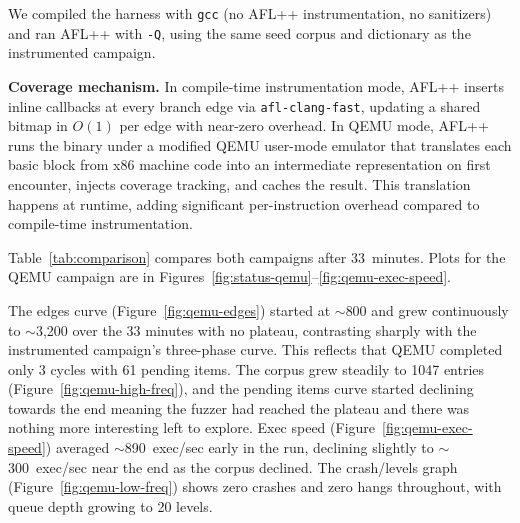 \documentclass[letterpaper,twocolumn,10pt]{article}
\begin{document}
We compiled the harness with \texttt{gcc} (no AFL++ instrumentation,
no sanitizers) and ran AFL++ with \texttt{-Q}, using the same seed
corpus and dictionary as the instrumented campaign.
 
\textbf{Coverage mechanism.} In compile-time instrumentation mode,
AFL++ inserts inline callbacks at every branch edge via
\texttt{afl-clang-fast}, updating a shared bitmap in $O(1)$ per
edge with near-zero overhead. In QEMU mode, AFL++ runs the binary
under a modified QEMU user-mode emulator that translates each basic
block from x86 machine code into an intermediate representation on
first encounter, injects coverage tracking, and caches the result.
This translation happens at runtime, adding significant per-instruction
overhead compared to compile-time instrumentation.
 
Table~\ref{tab:comparison} compares both campaigns after 33~minutes.
Plots for the QEMU campaign are in
Figures~\ref{fig:status-qemu}--\ref{fig:qemu-exec-speed}.
 
The edges curve (Figure~\ref{fig:qemu-edges}) started at $\sim$800
and grew continuously to $\sim$3{,}200 over the 33 minutes with no
plateau, contrasting sharply with the instrumented campaign's
three-phase curve. This reflects that QEMU completed only 3 cycles
with 61 pending items. The corpus grew steadily to 1047 entries
(Figure~\ref{fig:qemu-high-freq}), and the pending items
curve started declining towards the end meaning the fuzzer had reached the plateau and there was nothing more interesting left to explore. Exec speed (Figure~\ref{fig:qemu-exec-speed}) averaged
$\sim$890~exec/sec early in the run, declining slightly to
$\sim$300~exec/sec near the end as the corpus declined. The crash/levels graph
(Figure~\ref{fig:qemu-low-freq}) shows zero crashes and zero hangs
throughout, with queue depth growing to 20 levels.
 
 
\end{document}
